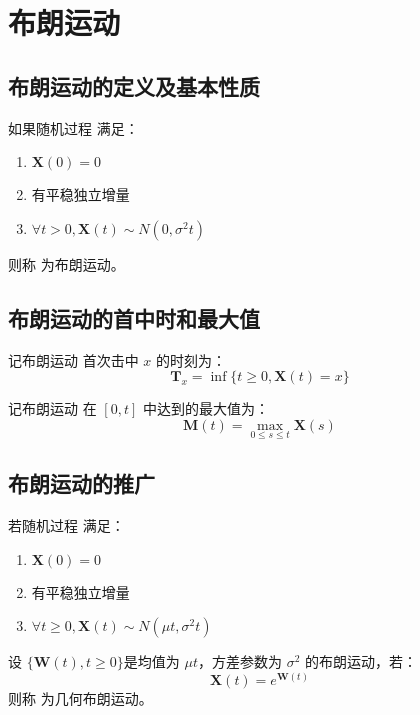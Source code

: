 \section{布朗运动}
    \subsection{布朗运动的定义及基本性质}
        \begin{definition}[布朗运动]
            如果随机过程 \ContinuousMarkovChain 满足：
            \begin{enumerate}[label=(\arabic*).]
                \item $\textbf{X}(0) = 0$
                \item \ContinuousMarkovChain 有平稳独立增量
                \item $\forall t > 0, \textbf{X}(t) \sim N(0, \sigma^2 t)$
            \end{enumerate}
            则称 \ContinuousMarkovChain 为布朗运动。
        \end{definition}
    \subsection{布朗运动的首中时和最大值}
        \begin{definition}[首中时]
            记布朗运动 \ContinuousMarkovChain 首次击中 $x$ 的时刻为：
            \[ \textbf{T}_x = \inf\{t \geq 0, \textbf{X}(t) = x\} \]
        \end{definition}

        \begin{definition}[最大值]
            记布朗运动 \ContinuousMarkovChain 在 $[0, t]$ 中达到的最大值为：
            \[ \textbf{M}(t) = \max_{0 \leq s \leq t} \textbf{X}(s) \]
        \end{definition}
    \subsection{布朗运动的推广}
        \begin{definition}[带有线性漂移的布朗运动]
            若随机过程 \ContinuousMarkovChain 满足：
            \begin{enumerate}[label=(\arabic*)]
                \item $ \textbf{X}(0) = 0 $
                \item \ContinuousMarkovChain 有平稳独立增量
                \item $ \forall t \geq 0, \textbf{X}(t) \sim N(\mu t, \sigma^2 t) $
            \end{enumerate}
        \end{definition}

        \begin{definition}[几何布朗运动]
            设 $\{\textbf{W}(t), t \geq 0\}$是均值为 $\mu t$，方差参数为 $\sigma^2$ 的布朗运动，若：
            \[\textbf{X}(t) = e^{\textbf{W}(t)}\]
            则称 \ContinuousMarkovChain 为几何布朗运动。
            
        \end{definition}
